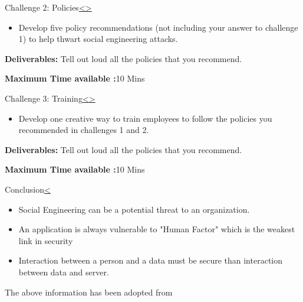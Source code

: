 \documentclass[12pt]{extarticle}
\newenvironment{instructionblock}{\Large\bgroup}{\egroup}
\begin{document}
\pagebreak
\begin{slide}{Challenge 2: Policies}{\hyperref[slide 22]{\textless}\hyperref[slide 24]{\textgreater}}
	\begin{instructionblock}
		\begin{itemize}
			
			\item Develop five policy recommendations (not including your answer to challenge 1) to help thwart social engineering attacks.
		\end{itemize}
			\textbf{Deliverables:} Tell out loud all the policies that you recommend.
			
			\textbf{Maximum Time available :}10 Mins
	\end{instructionblock}
\end{slide}
\pagebreak

\begin{slide}{Challenge 3: Training}{\hyperref[slide 23]{\textless}\hyperref[slide 25]{\textgreater}}
	\vskip 5pt
	\begin{instructionblock}
		\begin{itemize}
			\item    Develop one creative way to train employees to follow the policies you recommended in challenges 1 and 2.
		\end{itemize}
		\textbf{Deliverables:} Tell out loud all the policies that you recommend.
		
		\textbf{Maximum Time available :}10 Mins
	\end{instructionblock}
\end{slide}


\pagebreak

\begin{slide}{Conclusion}{\hyperref[slide 24]{\textless}}
	\vskip 5pt
	\begin{instructionblock}
		\begin{itemize}
		\item Social Engineering can be a potential threat to an organization.
		\item An application is always vulnerable to "Human Factor" which is the weakest link in security
		\item Interaction between a person and a data must be secure than interaction between data and server.
	    \end{itemize}
	\end{instructionblock}
\end{slide}
\vfill
The above information has been adopted from \cite{b1}
\pagebreak
\end{document}
